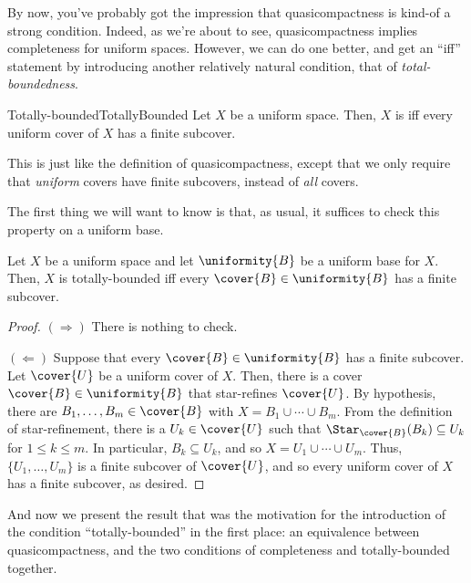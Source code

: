 By now, you've probably got the impression that quasicompactness is kind-of a strong condition.  Indeed, as we're about to see, quasicompactness implies completeness for uniform spaces.  However, we can do one better, and get an ``iff'' statement by introducing another relatively natural condition, that of \emph{total-boundedness}.
\begin{dfn}{Totally-bounded}{TotallyBounded}
Let $X$ be a uniform space.  Then, $X$ is  iff every uniform cover of $X$ has a finite subcover.
\begin{rmk}
This is just like the definition of quasicompactness, except that we only require that \emph{uniform} covers have finite subcovers, instead of \emph{all} covers.
\end{rmk}
\end{dfn}
The first thing we will want to know is that, as usual, it suffices to check this property on a uniform base.
\begin{prp}{}{}
Let $X$ be a uniform space and let $\uniformity{B}$ be a uniform base for $X$.  Then, $X$ is totally-bounded iff every $\cover{B}\in \uniformity{B}$ has a finite subcover.
\begin{proof}
$(\Rightarrow )$ There is nothing to check.

\blankline
\noindent
$(\Leftarrow )$ Suppose that every $\cover{B}\in \uniformity{B}$ has a finite subcover.  Let $\cover{U}$ be a uniform cover of $X$.  Then, there is a cover $\cover{B}\in \uniformity{B}$ that star-refines $\cover{U}$.  By hypothesis, there are $B_1,\ldots ,B_m\in \cover{B}$ with $X=B_1\cup \cdots \cup B_m$.  From the definition of star-refinement, there is a $U_k\in \cover{U}$ such that $\Star _{\cover{B}}(B_k)\subseteq U_k$ for $1\leq k\leq m$.  In particular, $B_k\subseteq U_k$, and so $X=U_1\cup \cdots \cup U_m$.  Thus, $\{ U_1,\ldots ,U_m\}$ is a finite subcover of $\cover{U}$, and so every uniform cover of $X$ has a finite subcover, as desired.
\end{proof}
\end{prp}
And now we present the result that was the motivation for the introduction of the condition ``totally-bounded'' in the first place:  an equivalence between quasicompactness, and the two conditions of completeness and totally-bounded together.
